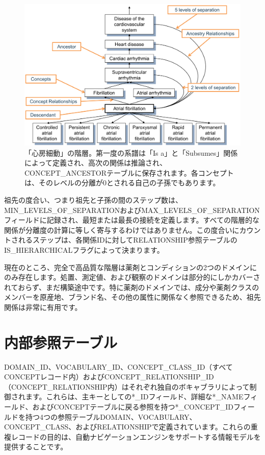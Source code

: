 \documentclass[
  11pt]{book}
\theoremstyle{definition}
\theoremstyle{definition}
\theoremstyle{definition}
\theoremstyle{definition}
\theoremstyle{remark}
\begin{document}
\begin{figure}

{\centering \includegraphics[width=1\linewidth]{images/StandardizedVocabularies/conceptAncestor} 

}

\caption{「心房細動」の階層。第一度の系譜は「Is a」と「Subsumes」関係によって定義され、高次の関係は推論され、CONCEPT\_ANCESTORテーブルに保存されます。各コンセプトは、そのレベルの分離が0とされる自己の子孫でもあります。 }\label{fig:conceptAncestor}
\end{figure}

祖先の度合い、つまり祖先と子孫の間のステップ数は、MIN\_LEVELS\_OF\_SEPARATIONおよびMAX\_LEVELS\_OF\_SEPARATIONフィールドに記録され、最短または最長の接続を定義します。すべての階層的な関係が分離度の計算に等しく寄与するわけではありません。この度合いにカウントされるステップは、各関係IDに対してRELATIONSHIP参照テーブルのIS\_HIERARCHICALフラグによって決まります。

現在のところ、完全で高品質な階層は薬剤とコンディションの2つのドメインにのみ存在します。処置、測定値、および観察のドメインは部分的にしかカバーされておらず、まだ構築途中です。特に薬剤のドメインでは、成分や薬剤クラスのメンバーを原産地、ブランド名、その他の属性に関係なく参照できるため、祖先関係は非常に有用です。

\section{内部参照テーブル}\label{ux5185ux90e8ux53c2ux7167ux30c6ux30fcux30d6ux30eb}

DOMAIN\_ID、VOCABULARY\_ID、CONCEPT\_CLASS\_ID（すべてCONCEPTレコード内）およびCONCEPT\_RELATIONSHIP\_ID（CONCEPT\_RELATIONSHIP内）はそれぞれ独自のボキャブラリによって制御されます。これらは、主キーとしての*\_IDフィールド、詳細な*\_NAMEフィールド、およびCONCEPTテーブルに戻る参照を持つ*\_CONCEPT\_IDフィールドを持つ4つの参照テーブルDOMAIN、VOCABULARY、CONCEPT\_CLASS、およびRELATIONSHIPで定義されています。これらの重複レコードの目的は、自動ナビゲーションエンジンをサポートする情報モデルを提供することです。
\end{document}

